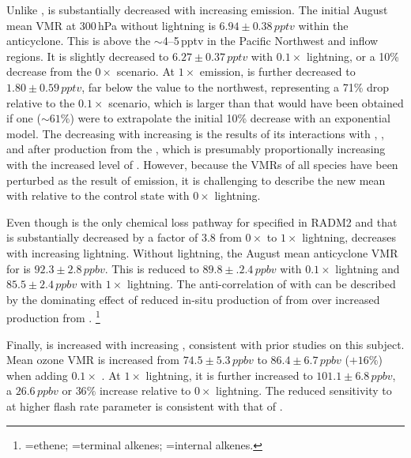 Unlike ,  is substantially decreased with increasing {\lnox} emission. The initial August mean VMR at 300\,\unit{hPa} without
lightning is $6.94\pm0.38\,\unit{pptv}$ within the anticyclone. This is above the $\sim$4--5\,\unit{pptv} in the Pacific Northwest and inflow regions. It is slightly decreased
to $6.27\pm0.37\,\unit{pptv}$ with $0.1\times$ lightning, or a 10\% decrease from the $0\times$ scenario. At $1\times$ {\lnox} emission, 
is further decreased to $1.80\pm0.59\,\unit{pptv}$, far below the value to the northwest, representing a 71\% drop relative to the $0.1\times$ scenario,
which is larger than that would have been obtained if one ($\sim61\%$) were to extrapolate the initial 10\% decrease with an exponential model.
The decreasing  with increasing  is the results of its interactions with , , and  after production
from the , which is presumably proportionally increasing with the increased level of . However, because the VMRs
of all species have been perturbed as the result of {\lnox} emission, it is challenging to describe the new mean  with {\lnox} relative to
the control state with $0\times$ lightning.

Even though  is the only chemical loss pathway for  specified in RADM2 and that  is
substantially decreased by a factor of 3.8 from $0\times$ to $1\times$ lightning,  decreases with increasing lightning. Without lightning, the
August mean anticyclone VMR for  is $92.3\pm2.8\,\unit{ppbv}$. This is reduced to $89.8\pm.2.4\,\unit{ppbv}$ with $0.1\times$ lightning
and $85.5\pm2.4\,\unit{ppbv}$ with $1\times$ lightning. The anti-correlation of  with {\lnox} can be described by the dominating effect of
reduced in-situ production of  from  over increased production from .
\footnote{=ethene; =terminal alkenes; =internal alkenes.}

Finally,  is increased with increasing {\lnox}, consistent with prior studies on this subject. Mean ozone VMR
is increased from $74.5\pm5.3\,\unit{ppbv}$ to $86.4\pm6.7\,\unit{ppbv}$ ($+16\%$) when adding $0.1\times$ {\lnox}. At $1\times$ lightning, it
is further increased to $101.1\pm6.8\,\unit{ppbv}$, a $26.6\,\unit{ppbv}$ or $36\%$ increase relative to $0\times$ lightning. The reduced sensitivity
to {\lnox} at higher flash rate parameter is consistent with that of .

